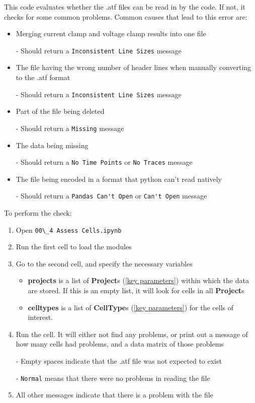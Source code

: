 \documentclass{article}
\begin{document}
This code evaluates whether the .atf files can be read in by the code. If not, it checks for some common problems. Common causes that lead to this error are:
\begin{itemize}
    \item Merging current clamp and voltage clamp results into one file
    
    - Should return a \verb|Inconsistent Line Sizes| message
    
    \item The file having the wrong number of header lines when manually converting to the .atf format
    
    - Should return a \verb|Inconsistent Line Sizes| message
    
    \item Part of the file being deleted
    
    - Should return a \verb|Missing| message
    
    \item The data being missing
    
    - Should return a \verb|No Time Points| or \verb|No Traces| message
    
    \item The file being encoded in a format that python can't read natively
    
    - Should return a \verb|Pandas Can't Open| or \verb|Can't Open| message
\end{itemize}

To perform the check:
\begin{enumerate}
    \item Open \verb|00\_4 Assess Cells.ipynb|
    
    \item Run the first cell to load the modules
    
    \item Go to the second cell, and specify the necessary variables
    
    \begin{itemize}
        \item \textbf{projects} is a list of \textbf{Project}s (\ref{key parameters}) within which the data are stored. If this is an empty list, it will look for cells in all \textbf{Project}s
        
        \item \textbf{celltypes} is a list of \textbf{CellType}s (\ref{key parameters}) for the cells of interest.
    \end{itemize}
    
    \item Run the cell. It will either not find any problems, or print out a message of how many cells had problems, and a data matrix of those problems
    
    - Empty spaces indicate that the .atf file was not expected to exist
    
    - \verb|Normal| means that there were no problems in reading the file
    
    \item All other messages indicate that there is a problem with the file
\end{enumerate}
\end{document}
